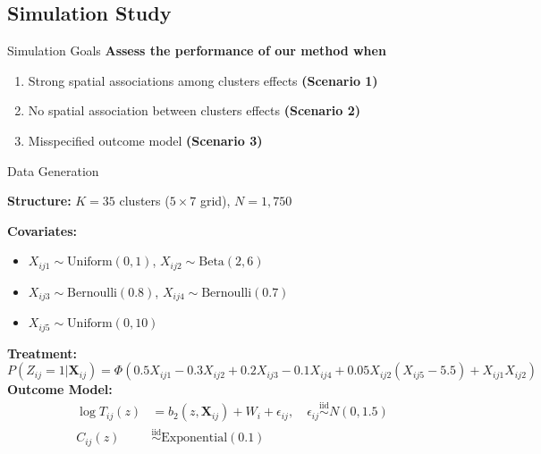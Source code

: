 \documentclass{beamer}
\begin{document}
\subsection{Simulation Study}
\begin{frame}{Simulation Goals}
\textbf{Assess the performance of our method when}
\begin{enumerate}
  

  \vfill  \item Strong spatial associations among clusters effects \textbf{(Scenario 1)}

  
 \vfill   \item  No spatial association between clusters effects \textbf{(Scenario 2)}
  \vfill  \item Misspecified outcome model \textbf{(Scenario 3)}
\end{enumerate}
    
\end{frame}
\begin{frame}{Data Generation}

\textbf{Structure:} $K = 35$ clusters ($5 \times 7$ grid), $N = 1,750$

\textbf{Covariates:}
\begin{itemize}
    \item $X_{ij1} \sim \text{Uniform}(0,1)$, $X_{ij2} \sim \text{Beta}(2,6)$
    \item $X_{ij3} \sim \text{Bernoulli}(0.8)$, $X_{ij4} \sim \text{Bernoulli}(0.7)$
    \item $X_{ij5} \sim \text{Uniform}(0,10)$
\end{itemize}
\pause
\textbf{Treatment:} $P(Z_{ij} = 1|\mathbf{X}_{ij}) = \Phi(0.5X_{ij1} - 0.3X_{ij2} + 0.2X_{ij3} - 0.1X_{ij4} + 0.05X_{ij2}(X_{ij5} - 5.5) + X_{ij1}X_{ij2})$
\pause
\textbf{Outcome Model:}
\begin{align*}
\log T_{ij}(z) &= b_2(z, \mathbf{X}_{ij}) + W_i + \epsilon_{ij}, \quad \epsilon_{ij} \overset{\mathrm{iid}}{\sim} N(0, 1.5)\\
C_{ij}(z) &\overset{\mathrm{iid}}{\sim}\text{Exponential}(0.1)
\end{align*}

\end{frame}
\end{document}

